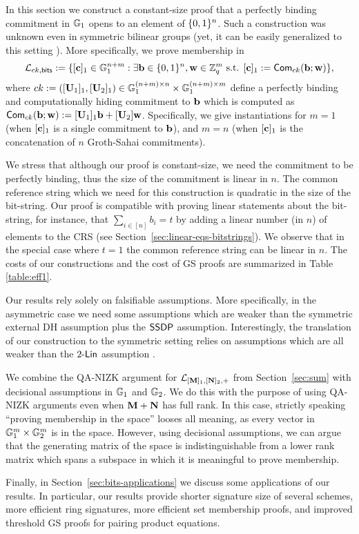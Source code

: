 In this section we construct a constant-size proof that a perfectly binding commitment in $\mathbb{G}_1$ opens to an element of $\{0,1\}^n$.   
Such a construction was unknown even in symmetric bilinear groups (yet, it can be easily generalized to this setting \cite[Appendix C]{EPRINT:GonHevRaf15}).
More specifically, we prove membership in 
$$\mathcal{\mathcal{L}}_{ck,\mathsf{bits}} := 
    \{[\mathbf{c}]_1 \in \mathbb{G}_1^{n+m}: \exists \mathbf{b}\in\{0,1\}^n,\mathbf{w}\in\mathbb{Z}_q^m \text{ s.t. }
        [\mathbf{c}]_1:=  \mathsf{Com}_{ck}(\mathbf{b};\mathbf{w})
    \},$$
 where $ck:=([\mathbf{{U}}_1]_1,[\mathbf{{U}}_2]_1)\in\mathbb{G}_1^{(n+m)\times n}\times\mathbb{G}_1^{(n+m)\times m}$ define a perfectly binding and computationally hiding commitment to $\mathbf{b}$ which is computed as $\mathsf{Com}_{ck}(\mathbf{b};\allowbreak\mathbf{w}):=[\mathbf{{U}}_1]_1\mathbf{b}+[\mathbf{{U}}_2]\mathbf{w}$. Specifically, we give instantiations for $m=1$ (when $[\mathbf{c}]_1$ is a single commitment to $\mathbf{b}$), and $m=n$ (when $[\mathbf{c}]_1$ is the concatenation  of $n$ Groth-Sahai commitments).

We stress that although our proof is constant-size, we need the commitment to be perfectly binding, thus the size of the commitment is linear in $n$.  The common reference string  which we need for this construction is quadratic in the size of the bit-string. Our proof is compatible with proving linear statements about the bit-string, for instance,  
that $\sum_{i \in [n]} b_i=t$ by adding a linear number (in $n$) of elements to the CRS (see Section~\ref{sec:linear-eqs-bitstrings}). We observe that in the special case where $t=1$ the common reference string can be linear in $n$. The costs of our constructions and the cost of GS proofs are summarized in Table \ref{table:eff1}.

Our results rely solely on falsifiable assumptions. More specifically, in the asymmetric case we need some assumptions which are weaker 
than the symmetric external DH assumption %
plus the $\mathsf{SSDP}$ assumption. Interestingly, the translation of our construction to the symmetric setting relies on assumptions which are all weaker than the $2\mbox{-}\mathsf{Lin}$ assumption \cite[Appendix C]{EPRINT:GonHevRaf15}.

We combine the QA-NIZK argument for $\mathcal{L}_{[\mathbf{{M}}]_1,[\mathbf{{N}}]_2,+}$ from Section~\ref{sec:sum} with decisional assumptions in $\mathbb{G}_1$ and $\mathbb{G}_2$. We do this with the purpose of using QA-NIZK arguments even when $\mathbf{{M}}+\mathbf{{N}}$ has full rank. In this case, strictly speaking ``proving membership in the space'' looses all meaning, as every vector in $\mathbb{G}_1^m\times \mathbb{G}_2^m$ is in the space. However, using decisional assumptions, we can argue that the generating matrix of the space is indistinguishable from a lower rank matrix which spans a subspace in which it is meaningful to prove membership.  

Finally, in Section~\ref{sec:bits-applications} we discuss some applications of our results.  
In particular, our results provide shorter %
signature size of several schemes,
  more efficient ring signatures,
  more efficient set membership proofs,
  and improved threshold GS proofs for pairing product equations.



